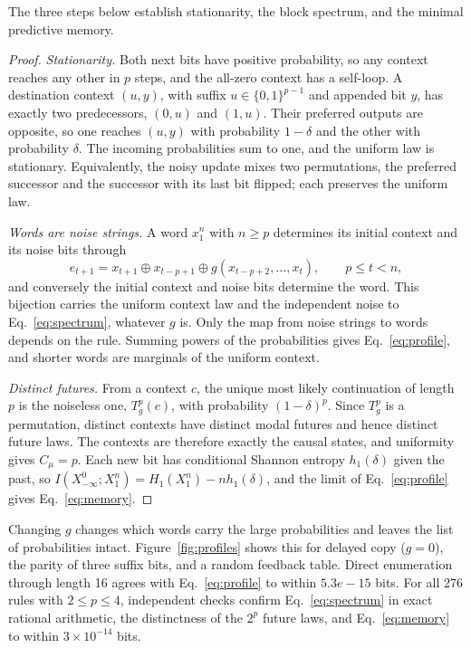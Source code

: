 \documentclass[11pt,a4paper]{article}
\newcommand{\bits}{\{0,1\}}
\newcommand{\ExactSpectrumError}{5.3e-15}
\begin{document}
The three steps below establish stationarity, the block spectrum, and the minimal predictive memory.

\begin{proof}
\emph{Stationarity.} Both next bits have positive probability, so any context reaches any other in \(p\) steps, and the all-zero context has a self-loop. A destination context \((u,y)\), with suffix \(u\in\bits^{p-1}\) and appended bit \(y\), has exactly two predecessors, \((0,u)\) and \((1,u)\). Their preferred outputs are opposite, so one reaches \((u,y)\) with probability \(1-\delta\) and the other with probability \(\delta\). The incoming probabilities sum to one, and the uniform law is stationary. Equivalently, the noisy update mixes two permutations, the preferred successor and the successor with its last bit flipped; each preserves the uniform law.

\emph{Words are noise strings.} A word \(x_1^n\) with \(n\ge p\) determines its initial context and its noise bits through
\[
e_{t+1}=x_{t+1}\oplus x_{t-p+1}\oplus g(x_{t-p+2},\ldots,x_t),
\qquad p\le t<n,
\]
and conversely the initial context and noise bits determine the word. This bijection carries the uniform context law and the independent noise to Eq.~\eqref{eq:spectrum}, whatever \(g\) is. Only the map from noise strings to words depends on the rule. Summing powers of the probabilities gives Eq.~\eqref{eq:profile}, and shorter words are marginals of the uniform context.

\emph{Distinct futures.} From a context \(c\), the unique most likely continuation of length \(p\) is the noiseless one, \(T_g^p(c)\), with probability \((1-\delta)^p\). Since \(T_g^p\) is a permutation, distinct contexts have distinct modal futures and hence distinct future laws. The contexts are therefore exactly the causal states, and uniformity gives \(C_\mu=p\). Each new bit has conditional Shannon entropy \(h_1(\delta)\) given the past, so \(I(X_{-\infty}^{0};X_1^n)=H_1(X_1^n)-n h_1(\delta)\), and the limit of Eq.~\eqref{eq:profile} gives Eq.~\eqref{eq:memory}.
\end{proof}

Changing \(g\) changes which words carry the large probabilities and leaves the list of probabilities intact. Figure~\ref{fig:profiles} shows this for delayed copy (\(g=0\)), the parity of three suffix bits, and a random feedback table. Direct enumeration through length 16 agrees with Eq.~\eqref{eq:profile} to within \(\ExactSpectrumError\) bits. For all 276 rules with \(2\le p\le4\), independent checks confirm Eq.~\eqref{eq:spectrum} in exact rational arithmetic, the distinctness of the \(2^p\) future laws, and Eq.~\eqref{eq:memory} to within \(3\times10^{-14}\) bits.
\end{document}
